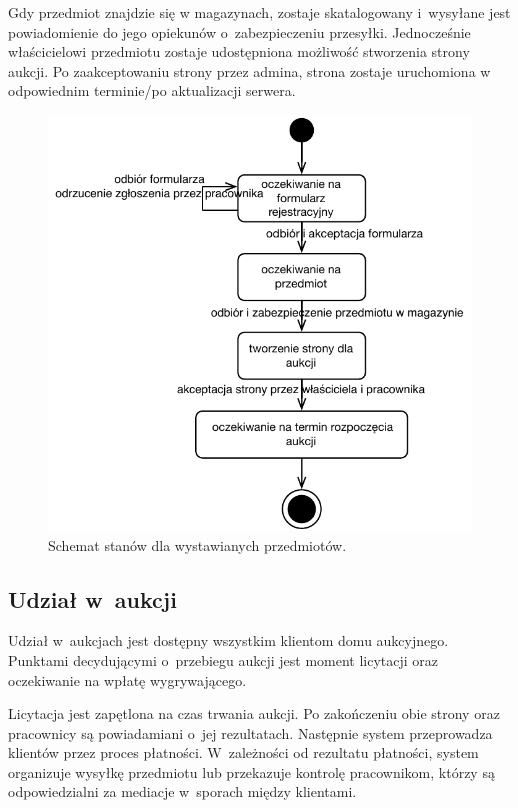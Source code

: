 \documentclass[10pt,a4paper]{article}
\begin{document}
Gdy przedmiot znajdzie się w magazynach, zostaje skatalogowany i~wysyłane jest
powiadomienie do jego opiekunów o~zabezpieczeniu przesyłki. Jednocześnie
właścicielowi przedmiotu zostaje udostępniona możliwość stworzenia strony
aukcji. Po zaakceptowaniu strony przez admina, strona zostaje uruchomiona w
odpowiednim terminie/po aktualizacji serwera.

\vspace{40pt}
\begin{figure}[hb]
  \begin{adjustwidth}{-3cm}{-3cm}
    \centering
    \includegraphics{figury/stan-wystaw-przedmiot}
    \caption{Schemat stanów dla wystawianych przedmiotów.}
    \label{fig:stan_wystaw_przedmiot}
  \end{adjustwidth}
\end{figure}
\clearpage

\subsection{Udział w~aukcji}

Udział w~aukcjach jest dostępny wszystkim klientom domu aukcyjnego. Punktami
decydującymi o~przebiegu aukcji jest moment licytacji oraz oczekiwanie na
wpłatę wygrywającego.

Licytacja jest zapętlona na czas trwania aukcji. Po zakończeniu obie strony
oraz pracownicy są powiadamiani o~jej rezultatach. Następnie system
przeprowadza klientów przez proces płatności. W~zależności od rezultatu
płatności, system organizuje wysyłkę przedmiotu lub przekazuje kontrolę
pracownikom, którzy są odpowiedzialni za mediacje w~sporach między klientami.
\end{document}
